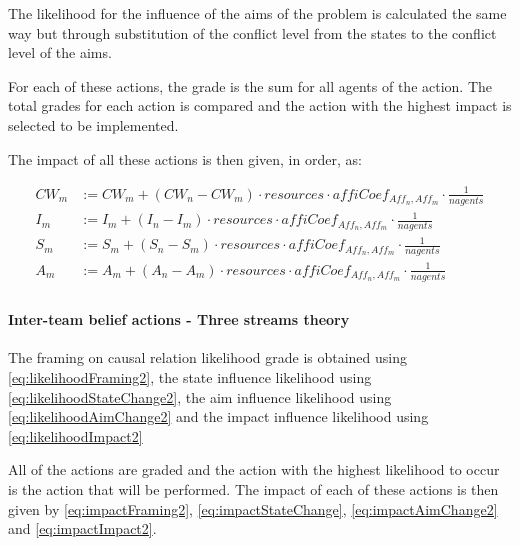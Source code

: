 The likelihood for the influence of the aims of the problem is calculated the same way but through substitution of the conflict level from the states to the conflict level of the aims.

For each of these actions, the grade is the sum for all agents of the action. The total grades for each action is compared and the action with the highest impact is selected to be implemented.

The impact of all these actions is then given, in order, as:

\begin{equation} \begin{split}
CW_{m} &:= CW_{m} + \left( CW_{n} - CW_{m} \right) \cdot resources \cdot affiCoef_{Aff_n,Aff_m} \cdot \frac{1}{nagents} \\
I_{m} &:= I_{m} +  \left(I_{n} - I_{m} \right)  \cdot resources \cdot affiCoef_{Aff_n,Aff_m} \cdot \frac{1}{nagents} \\
S_{m} &:= S_{m} + \left(S_{n} - S_{m} \right) \cdot resources \cdot affiCoef_{Aff_n,Aff_m} \cdot \frac{1}{nagents} \\
A_{m} &:= A_{m} + \left(A_{n} - A_{m} \right) \cdot resources \cdot affiCoef_{Aff_n,Aff_m} \cdot \frac{1}{nagents} \\
\end{split}\end{equation}

\paragraph{Inter-team belief actions - Three streams theory}

The framing on causal relation likelihood grade is obtained using \autoref{eq:likelihoodFraming2}, the state influence likelihood using \autoref{eq:likelihoodStateChange2}, the aim influence likelihood using \autoref{eq:likelihoodAimChange2} and the impact influence likelihood using \autoref{eq:likelihoodImpact2}

All of the actions are graded and the action with the highest likelihood to occur is the action that will be performed. The impact of each of these actions is then given by \autoref{eq:impactFraming2}, \autoref{eq:impactStateChange}, \autoref{eq:impactAimChange2} and \autoref{eq:impactImpact2}.


